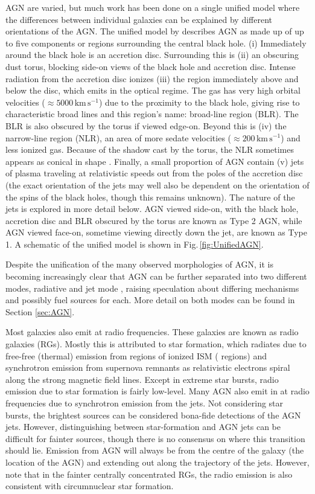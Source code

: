 	AGN are varied, but much work has been done on a single unified model where the differences between individual galaxies can be explained by different orientations of the AGN. The unified model by \citet{Antonucci1993} describes AGN as made up of up to five components or regions surrounding the central black hole. (i) Immediately around the black hole is an accretion disc. Surrounding this is (ii) an obscuring dust torus, blocking side-on views of the black hole and accretion disc. Intense radiation from the accretion disc ionizes (iii) the region immediately above and below the disc, which emits in the optical regime. The gas has very high orbital velocities ($\approx 5000 \, \mathrm{km \, s^{-1}}$) due to the proximity to the black hole, giving rise to characteristic broad lines and this region's name: broad-line region (BLR). The BLR is also obscured by the torus if viewed edge-on. Beyond this is (iv) the narrow-line region (NLR), an area of more sedate velocities ($\approx 200 \, \mathrm{km \, s^{-1}}$) and less ionized gas. Because of the shadow cast by the torus, the NLR sometimes appears as conical in shape \citep{Wilson1994}. Finally, a small proportion of AGN contain (v) jets of plasma traveling at relativistic speeds out from the poles of the accretion disc (the exact orientation of the jets may well also be dependent on the orientation of the spins of the black holes, though this remains unknown). The nature of the jets is explored in more detail below. AGN viewed side-on, with the black hole, accretion disc and BLR obscured by the torus are known as Type 2 AGN, while AGN viewed face-on, sometime viewing directly down the jet, are known as Type 1. A schematic of the unified model is shown in Fig.\,\ref{fig:UnifiedAGN}.


	Despite the unification of the many observed morphologies of AGN, it is becoming increasingly clear that AGN can be further separated into two different modes, radiative and jet mode \citep[e.g.][]{Antonucci2012}, raising speculation about differing mechanisms and possibly fuel sources for each. More detail on both modes can be found in Section \ref{sec:AGN}. 


	Most galaxies also emit at radio frequencies. These galaxies are known as radio galaxies (RGs). Mostly this is attributed to star formation, which radiates due to free-free (thermal) emission from regions of ionized ISM ( regions) and synchrotron emission from supernova remnants as relativistic electrons spiral along the strong magnetic field lines. Except in extreme star bursts, radio emission due to star formation is fairly low-level. Many AGN also emit in at radio frequencies due to synchrotron emission from the jets. Not considering star bursts, the brightest sources can be considered bona-fide detections of the AGN jets. However, distinguishing between star-formation and AGN jets can be difficult for fainter sources, though there is no consensus on where this transition should lie. Emission from AGN will always be from the centre of the galaxy (the location of the AGN) and extending out along the trajectory of the jets. However, \citet{Nyland2016} note that in the fainter centrally concentrated RGs, the radio emission is also consistent with circumnuclear star formation.

